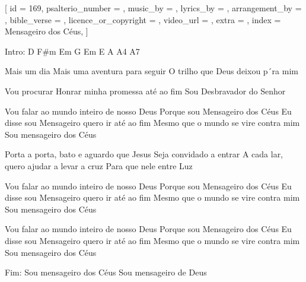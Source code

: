 
[
    id                     = {169},
    psalterio_number       = {},
    music_by               = {},
    lyrics_by              = {},
    arrangement_by         = {},
    bible_verse            = {},
    licence_or_copyright   = {},
    video_url              = {},
    extra                  = {},
    index                  = {Mensageiro dos Céus},
]



\beginverse*
Intro: D F#m Em G Em E A A4 A7
\endverse


\beginverse

Mais um dia
Mais uma aventura para seguir
O trilho que Deus deixou p´ra mim

Vou procurar
Honrar minha promessa até ao fim
Sou Desbravador do Senhor

\endverse


\beginchorus

Vou falar ao mundo inteiro de nosso Deus
Porque sou Mensageiro dos Céus
Eu disse sou Mensageiro quero ir até ao fim
Mesmo que o mundo se vire contra mim
Sou mensageiro dos Céus

\endchorus


\beginverse

Porta a porta, bato e aguardo que Jesus
Seja convidado a entrar
A cada lar, quero ajudar a levar a cruz
Para que nele entre Luz

\endverse


\beginchorus

Vou falar ao mundo inteiro de nosso Deus
Porque sou Mensageiro dos Céus
Eu disse sou Mensageiro quero ir até ao fim
Mesmo que o mundo se vire contra mim
Sou mensageiro dos Céus

\endchorus


\beginchorus

Vou falar ao mundo inteiro de nosso Deus
Porque sou Mensageiro dos Céus
Eu disse sou Mensageiro quero ir até ao fim
Mesmo que o mundo se vire contra mim
Sou mensageiro dos Céus

\endchorus


\beginverse
Fim:
Sou mensageiro dos Céus
Sou mensageiro de Deus
\endverse

\endsong
